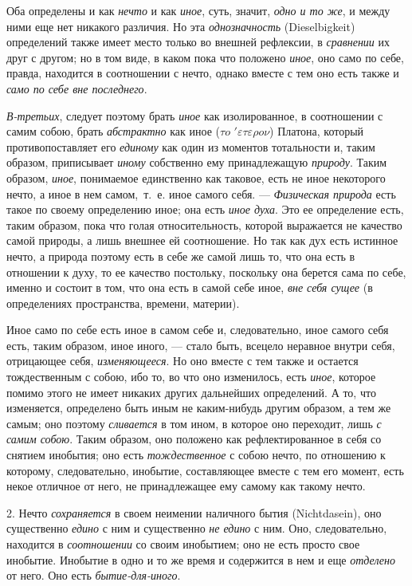 Оба определены и как {\em нечто} и как
{\em иное}, суть, значит,
{\em одно и то же}, и между ними еще нет никакого
различия. Но эта {\em однозначность} (Dieselbigkeit)
определений также имеет место только во внешней рефлексии, в
{\em сравнении} их друг с другом; но в том виде, в
каком пока что положено {\em иное}, оно само по себе,
правда, находится в соотношении с нечто, однако вместе с тем оно есть также
и {\em само по себе вне последнего}.

{\em В-третьих}, следует поэтому брать
{\em иное} как изолированное, в соотношении с самим
собою, брать {\em абстрактно} как иное ($\tau o$
$'{\varepsilon} \tau \varepsilon \rho o\nu $) Платона, который
противопоставляет его {\em единому} как один из
моментов тотальности и, таким образом, приписывает
{\em иному} собственно ему принадлежащую
{\em природу}. Таким образом,
{\em иное}, понимаемое единственно как таковое, есть
не иное некоторого нечто, а иное в нем самом,~т.~е. иное самого себя.
— {\em Физическая природа} есть такое по своему
определению иное; она есть {\em иное духа}. Это ее
определение есть, таким образом, пока что голая относительность, которой
выражается не качество самой природы, а лишь внешнее ей соотношение. Но так
как дух есть истинное нечто, а природа поэтому есть в себе же самой лишь
то, что она есть в отношении к духу, то ее качество постольку, поскольку
она берется сама по себе, именно и состоит в том, что она есть в самой себе
иное, {\em вне себя сущее} (в определениях
пространства, времени, материи).

Иное само по себе есть иное в самом себе и, следовательно, иное самого
себя есть, таким образом, иное иного, — стало быть, всецело неравное
внутри себя, отрицающее себя, {\em изменяющееся}. Но
оно вместе с тем также и остается тождественным с собою, ибо то, во что оно
изменилось, есть {\em иное}, которое помимо этого не
имеет никаких других дальнейших определений. А то, что изменяется,
определено быть иным не каким-нибудь другим образом, а тем же самым; оно
поэтому {\em сливается} в том ином, в которое оно
переходит, лишь {\em с самим собою}. Таким образом, оно
положено как рефлектированное в себя со снятием инобытия; оно есть
{\em тождественное} с собою нечто, по отношению к
которому, следовательно, инобытие, составляющее вместе с тем его момент,
есть некое отличное от него, не принадлежащее ему самому как такому нечто.

2. Нечто {\em сохраняется} в своем неимении наличного
бытия (Nichtdasein), оно существенно {\em едино} с ним
и существенно {\em не едино} с ним. Оно, следовательно,
находится в {\em соотношении} со своим инобытием; оно
не есть просто свое инобытие. Инобытие в одно и то же время и содержится в
нем и еще {\em отделено} от него. Оно есть
{\em бытие-для-иного}.

